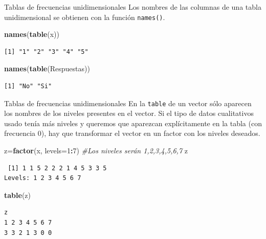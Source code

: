 \documentclass[
  ignorenonframetext,
]{beamer}
\newenvironment{Shaded}{\begin{snugshade}}{\end{snugshade}}
\newcommand{\AttributeTok}[1]{\textcolor[rgb]{0.13,0.29,0.53}{#1}}
\newcommand{\CommentTok}[1]{\textcolor[rgb]{0.56,0.35,0.01}{\textit{#1}}}
\newcommand{\DecValTok}[1]{\textcolor[rgb]{0.00,0.00,0.81}{#1}}
\newcommand{\FunctionTok}[1]{\textcolor[rgb]{0.13,0.29,0.53}{\textbf{#1}}}
\newcommand{\NormalTok}[1]{#1}
\newcommand{\OtherTok}[1]{\textcolor[rgb]{0.56,0.35,0.01}{#1}}
\newcommand{\SpecialCharTok}[1]{\textcolor[rgb]{0.81,0.36,0.00}{\textbf{#1}}}
\begin{document}
\begin{frame}[fragile]{Tablas de frecuencias unidimensionales}
\label{tablas-de-frecuencias-unidimensionales-3}
Los nombres de las columnas de una tabla unidimensional se obtienen con
la función \texttt{names()}.

\begin{Shaded}
\begin{Highlighting}[]
\FunctionTok{names}\NormalTok{(}\FunctionTok{table}\NormalTok{(x))}
\end{Highlighting}
\end{Shaded}

\begin{verbatim}
[1] "1" "2" "3" "4" "5"
\end{verbatim}

\begin{Shaded}
\begin{Highlighting}[]
\FunctionTok{names}\NormalTok{(}\FunctionTok{table}\NormalTok{(Respuestas))}
\end{Highlighting}
\end{Shaded}

\begin{verbatim}
[1] "No" "Si"
\end{verbatim}
\end{frame}

\begin{frame}[fragile]{Tablas de frecuencias unidimensionales}
\label{tablas-de-frecuencias-unidimensionales-4}
En la \texttt{table} de un vector sólo aparecen los nombres de los
niveles presentes en el vector. Si el tipo de datos cualitativos usado
tenía más niveles y queremos que aparezcan explícitamente en la tabla
(con frecuencia 0), hay que transformar el vector en un factor con los
niveles deseados.

\begin{Shaded}
\begin{Highlighting}[]
\NormalTok{z}\OtherTok{=}\FunctionTok{factor}\NormalTok{(x, }\AttributeTok{levels=}\DecValTok{1}\SpecialCharTok{:}\DecValTok{7}\NormalTok{) }\CommentTok{\#Los niveles serán 1,2,3,4,5,6,7 }
\NormalTok{z}
\end{Highlighting}
\end{Shaded}

\begin{verbatim}
 [1] 1 1 5 2 2 2 1 4 5 3 3 5
Levels: 1 2 3 4 5 6 7
\end{verbatim}

\begin{Shaded}
\begin{Highlighting}[]
\FunctionTok{table}\NormalTok{(z)}
\end{Highlighting}
\end{Shaded}

\begin{verbatim}
z
1 2 3 4 5 6 7 
3 3 2 1 3 0 0 
\end{verbatim}
\end{frame}
\end{document}
